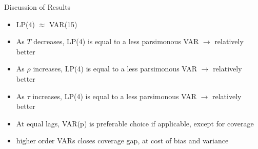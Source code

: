 \begin{frame}{Discussion of Results}

    \begin{itemize}
        \item LP(4) $\approx$ VAR(15)
        \item As $T$ decreases, LP(4) is equal to a less parsimonous VAR $\to$ relatively better
        \item As $\rho$ increases, LP(4) is equal to a less parsimonous VAR $\to$ relatively better
        \item \colorbox{orange!10}{As $\tau$ increases, LP(4) is equal to a less parsimonous VAR $\to$ relatively better}
        \item At equal lags, VAR(p) is preferable choice if applicable, except for coverage
        \item higher order VARs closes coverage gap, at cost of bias and variance
    \end{itemize}


    
\end{frame}
